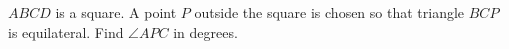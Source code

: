 $ABCD$ is a square. A point $P$ outside the square is chosen so that triangle $BCP$ is equilateral. Find $\angle APC$ in degrees.
